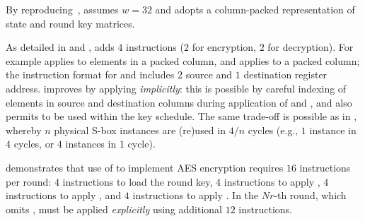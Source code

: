 
By reproducing~\cite[Section 4.3]{TilGro:06},
assumes 
$w = 32$
and adopts a 
column-packed 
representation of state and round key matrices.

As detailed in
and
,
adds
$ 4$
instructions ($2$ for encryption, $2$ for decryption).
For example
applies 
to elements in   a packed column,
and
applies 
to               a packed column;
the instruction format for
and
includes $2$ source and $1$ destination register address.
 improves  by applying  
{\em implicitly}:
this is possible by careful indexing of elements in source and destination
columns during application of  and ,
and also permits
to be used within the key schedule.
The same trade-off is possible as in , whereby
$n$ physical S-box instances are (re)used in $4/n$ cycles
(e.g., $1$ instance in $4$ cycles, or $4$ instances in $1$ cycle).

demonstrates that use of  to implement AES encryption requires
$16$ instructions per round:
$ 4$            
     instructions to load the round key,
$ 4$            
     instructions to apply ,
$ 4$   
     instructions to apply ,
     and
$ 4$   
     instructions to apply .
In the $Nr$-th round, which omits ,
 must be applied
{\em explicitly}
using additional 
$12$ instructions.

